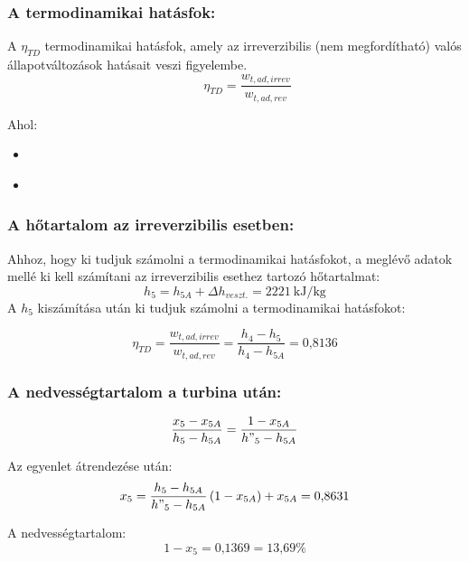 \subsubsection{A termodinamikai hatásfok:}
A $\eta_{TD}$ termodinamikai hatásfok, amely az irreverzibilis (nem megfordítható)
 valós állapotváltozások hatásait veszi figyelembe.
				\begin{equation*}
				\quad
				\quad
				\quad
				\eta_{TD} = \dfrac{w_{t,ad,irrev}}{w_{t,ad,rev}}
				\quad
			\end{equation*}

\noindent
Ahol:
\begin{itemize}
	\item  {}
\end{itemize}
\begin{itemize}
	\item  {}
\end{itemize}

\pagebreak
\subsubsection{A hőtartalom az irreverzibilis esetben:}
Ahhoz, hogy ki tudjuk számolni a termodinamikai hatásfokot, a meglévő adatok mellé ki kell számítani az irreverzibilis esethez tartozó hőtartalmat:
\begin{equation*}
h_5 = h_{5A} + \Delta h_{veszt.} = \SI{2221}{\kilo\joule\per\kilogram}
\end{equation*}
\noindent
A $h_5$ kiszámítása után ki tudjuk számolni a termodinamikai hatásfokot:

\begin{equation*}
\eta_{TD} = \dfrac{w_{t,ad,irrev}}{w_{t,ad,rev}} =  \dfrac{h_4 - h_5}{h_4-h_{5A}} = \text{0,8136}
\end{equation*}

\subsubsection{A nedvességtartalom a turbina után:}
\begin{equation*}
 \dfrac{x_5-x_{5A}}{h_5-h_{5A}} =  \dfrac{1 - x_{5A}}{h"_5-h_{5A}}
\end{equation*}

\noindent
Az egyenlet átrendezése után:
\begin{equation*}
x_5 = \dfrac{h_5-h_{5A}}{h"_5-h_{5A}}\left( 1 - x_{5A}\right) +x_{5A} = \text{0,8631}
\end{equation*}

\noindent
A nedvességtartalom:
\begin{equation*}
1 - x_5 = \text{0,1369} = \text{13,69\%}
\end{equation*}
